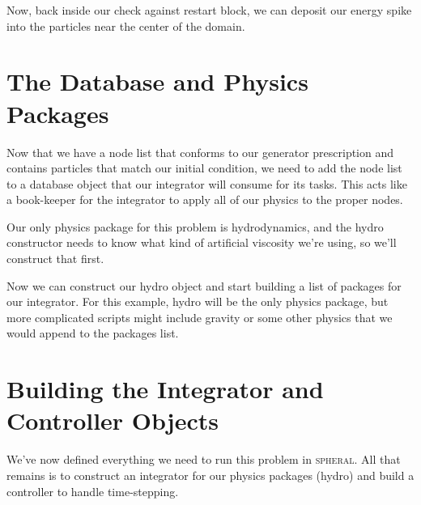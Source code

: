 \documentclass[11pt]{memoir}
\begin{document}


Now, back inside our check against restart block, we can deposit our energy spike into the particles near the center of the domain.



\section{The Database and Physics Packages}

Now that we have a node list that conforms to our generator prescription and contains particles that match our initial condition, we need to add the node list to a database object that our integrator will consume for its tasks. This acts like a book-keeper for the integrator to apply all of our physics to the proper nodes.



Our only physics package for this problem is hydrodynamics, and the hydro constructor needs to know what kind of artificial viscosity we're using, so we'll construct that first.



Now we can construct our hydro object and start building a list of packages for our integrator. 
For this example, hydro will be the only physics package, but more complicated scripts might include gravity or some other physics that we would append to the packages list.



\section{Building the Integrator and Controller Objects}

We've now defined everything we need to run this problem in \textsc{spheral}.
All that remains is to construct an integrator for our physics packages (hydro) and build a controller to handle time-stepping.


\end{document}
